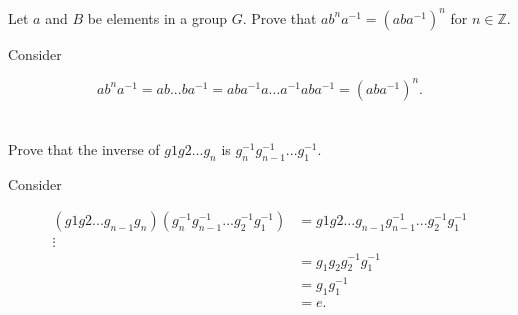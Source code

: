 \documentclass[a4paper]{article}
\begin{document}
\section{}


\section{}

Let $a$ and $B$ be elements in a group $G$. Prove that $ab^na^{-1} = (aba^{-1})^n$ for $n \in \mathbb{Z}$.

\vspace{\baselineskip}

Consider

$$ab^na^{-1} = a b ... b  a^{-1} = a  b a^{-1} a ... a^{-1} a b a^{-1} = (aba^{-1})^n.$$


\section{}


\section{}

Prove that the inverse of $g1 g2 ... g_n$ is $g_n^{-1} g_{n-1}^{-1} ... g_1^{-1}$.

\vspace{\baselineskip}

Consider

\begin{align*}
(g1 g2 ... g_{n-1} g_n) (g_n^{-1} g_{n-1}^{-1} ... g_2^{-1} g_1^{-1}) &= g1 g2 ... g_{n-1} g_{n-1}^{-1} ... g_2^{-1} g_1^{-1} \\
\vdots \\
&= g_1 g_2 g_2^{-1} g_1^{-1} \\
&= g_1 g_1^{-1} \\
&= e.
\end{align*}
\end{document}
